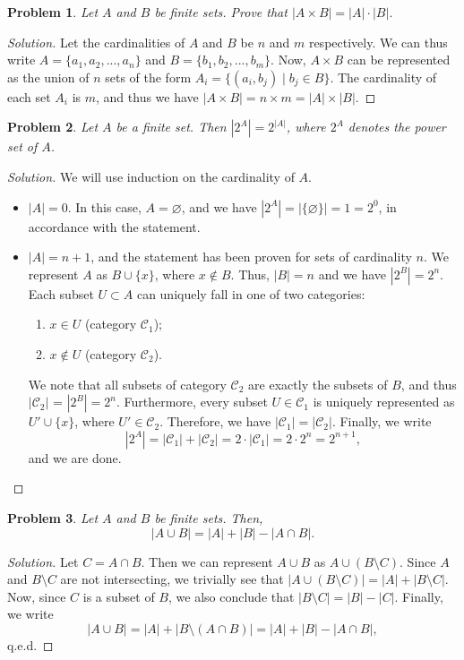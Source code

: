 \documentclass[a4paper, 12pt]{article}
\theoremstyle{plain}
\newtheorem{problem}{Problem}
\begin{document}
\begin{problem}
    Let $A$ and $B$ be finite sets. Prove that $|A \times B| = |A| \cdot |B|$.
\end{problem}
\begin{proof}[Solution]
    Let the cardinalities of $A$ and $B$ be $n$ and $m$ respectively. We can thus write $A = \{a_1, a_2, ..., a_n\}$ and $B = \{b_1, b_2, ..., b_m\}$. Now, $A \times B$ can be represented as the union of $n$ sets of the form $A_i = \{ (a_i, b_j) \mid b_j \in B \}$. The cardinality of each set $A_i$ is $m$, and thus we have $|A \times B| = n \times m = |A| \times |B|$.
\end{proof}

\begin{problem}
    Let $A$ be a finite set. Then $|2^A| = 2^{|A|}$, where $2^A$ denotes the power set of $A$.
\end{problem}
\begin{proof}[Solution]
    We will use induction on the cardinality of $A$.
    \begin{itemize}
        \item
            $|A| = 0$. In this case, $A = \varnothing$, and we have $|2^A| = |\{\varnothing\}| = 1 = 2^0$, in accordance with the statement.
        \item
            $|A| = n+1$, and the statement has been proven for sets of cardinality $n$. We represent $A$ as $B \cup \{x\}$, where $x \nin B$. Thus, $|B| = n$ and we have $|2^B| = 2^{n}$. Each subset $U \subset A$ can uniquely fall in one of two categories:
            \begin{enumerate}
                \item $x \in U$ (category $\mathcal{C}_1$);
                \item $x \nin U$ (category $\mathcal{C}_2$).
            \end{enumerate}
            We note that all subsets of category $\mathcal{C}_2$ are exactly the subsets of $B$, and thus $|\mathcal{C}_2|$ = $|2^B| = 2^n$. Furthermore, every subset $U \in \mathcal{C}_1$ is uniquely represented as $U' \cup \{x\}$, where $U' \in \mathcal{C}_2$. Therefore, we have $|\mathcal{C}_1| = |\mathcal{C}_2|$. Finally, we write
            \[ |2^A| = |\mathcal{C}_1| + |\mathcal{C}_2| = 2 \cdot |\mathcal{C}_1| = 2 \cdot 2^n = 2^{n+1}, \]
            and we are done.
    \end{itemize}
\end{proof}

\begin{problem}
    Let $A$ and $B$ be finite sets. Then,
    \[ |A \cup B| = |A| + |B| - |A \cap B|. \] 
\end{problem}
\begin{proof}[Solution]
    Let $C = A \cap B$. Then we can represent $A \cup B$ as $A \cup (B \setminus C)$. Since $A$ and $B \setminus C$ are not intersecting, we trivially see that $|A \cup (B \setminus C)| = |A| + |B \setminus C|$. Now, since $C$ is a subset of $B$, we also conclude that $|B \setminus C| = |B| - |C|$. Finally, we write
    \[
        |A \cup B| = |A| + |B \setminus (A \cap B)| = |A| + |B| - |A \cap B|,
    \] q.e.d. 
\end{proof}
\end{document}
